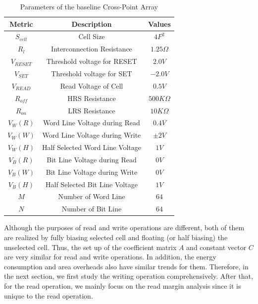 \begin{table}[!b]
  \centering
  \scriptsize
    \scriptsize
  \caption{Parameters of the baseline Cross-Point Array}\label{table:parameter}
  \vspace{-5pt}
  \begin{tabular}{c|c|c}
    \hline    \hline
    \textbf{Metric} & \textbf{Description} & \textbf{Values} \\
    \hline
    \textbf{$S_{cell}$} & Cell Size & \textbf{$4F^2$} \\
    \textbf{$R_l$} &  Interconnection Resistance&\textbf{$1.25\Omega$} \\
    \textbf{$V_{RESET}$} & Threshold voltage for RESET&\textbf{$2.0V$} \\
    \textbf{$V_{SET}$} & Threshold voltage for SET&\textbf{$-2.0V$} \\
    \textbf{$V_{READ}$} & Read Voltage of Cell&\textbf{$0.5V$} \\
    \textbf{$R_{off}$} & HRS Resistance &\textbf{$500K\Omega$} \\
    \textbf{$R_{on}$} & LRS Resistance &\textbf{$10K\Omega$} \\
    \textbf{$V_{W}(R)$} & Word Line Voltage during Read &\textbf{$0.4V$} \\
    \textbf{$V_{W}(W)$} & Word Line Voltage during Write  &\textbf{$\pm2V$} \\
    \textbf{$V_{W}(H)$} & Half Selected Word Line Voltage &\textbf{$1V$} \\
    \textbf{$V_{B}(R)$} & Bit Line Voltage during Read  &\textbf{$0V$} \\
    \textbf{$V_{B}(W)$} & Bit Line Voltage during Write  &\textbf{$0V$} \\
    \textbf{$V_{B}(H)$} & Half Selected Bit Line Voltage &\textbf{$1V$} \\
    \textbf{$M$} & Number of Word Line &\textbf{$64$} \\
    \textbf{$N$} & Number of Bit Line &\textbf{$64$} \\
    \hline
  \end{tabular}
  \vspace{-10pt}
\end{table}

Although the purposes of read and write operations are different, both of them are realized by fully biasing selected cell and floating (or half biasing) the unselected cell. Thus, the set up of the coefficient matrix $A$ and constant vector $C$ are very similar for read and write operations. In addition, the energy consumption and area overheads also have similar trends for them. Therefore, in the next section,  we first study the writing operation comprehensively.  After that, for the read operation, we mainly focus on the read margin analysis since it is unique to the read operation.

